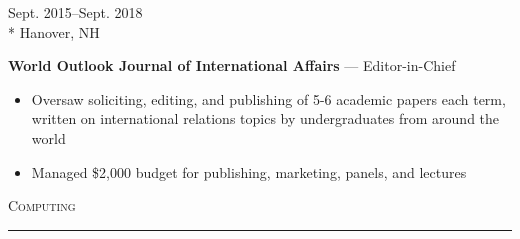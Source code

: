 \documentclass[a4paper,9pt]{article}
\begin{document}
\vspace{-3ex}
\begin{minipage}[t]{0.20\linewidth}
	\begin{small}
		\begin{spacing}{1.10}
			\begin{flushright}
				Sept. 2015--Sept. 2018
				\\*
				\vspace*{2.5pt}
				Hanover, NH
			\end{flushright}
		\end{spacing}
	\end{small}
\end{minipage}
\hspace{4mm}
\begin{minipage}[t]{0.75\linewidth}
	\begin{small}
		\begin{spacing}{1.00}
			\begin{flushleft}
				\textbf{World Outlook Journal of International Affairs} --- Editor-in-Chief
                \begin{itemize}[itemsep=0pt,topsep=2.5pt,leftmargin=*]
					\item Oversaw soliciting, editing, and publishing of 5-6 academic papers each term, written on international relations
topics by undergraduates from around the world
					\item Managed \$2,000 budget for publishing, marketing, panels, and lectures
				\end{itemize}
			\end{flushleft}
		\end{spacing}
	\end{small}
\end{minipage}

\vspace{-6ex}
\vspace*{25pt}

\begin{Large}
	\textsc{Computing}
\end{Large}
\vspace*{5pt}
\hrule
\vspace*{5pt}
\end{document}
